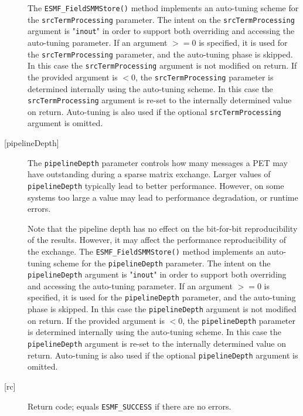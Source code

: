 \begin{description}
       \begin{sloppypar}
       The {\tt ESMF\_FieldSMMStore()} method implements an auto-tuning scheme
       for the {\tt srcTermProcessing} parameter. The intent on the
       {\tt srcTermProcessing} argument is "{\tt inout}" in order to
       support both overriding and accessing the auto-tuning parameter.
       If an argument $>= 0$ is specified, it is used for the
       {\tt srcTermProcessing} parameter, and the auto-tuning phase is skipped.
       In this case the {\tt srcTermProcessing} argument is not modified on
       return. If the provided argument is $< 0$, the {\tt srcTermProcessing}
       parameter is determined internally using the auto-tuning scheme. In this
       case the {\tt srcTermProcessing} argument is re-set to the internally
       determined value on return. Auto-tuning is also used if the optional
       {\tt srcTermProcessing} argument is omitted.
       \end{sloppypar}
  
     \item [{[pipelineDepth]}]
       The {\tt pipelineDepth} parameter controls how many messages a PET
       may have outstanding during a sparse matrix exchange. Larger values
       of {\tt pipelineDepth} typically lead to better performance. However,
       on some systems too large a value may lead to performance degradation,
       or runtime errors.
  
       Note that the pipeline depth has no effect on the bit-for-bit
       reproducibility of the results. However, it may affect the performance
       reproducibility of the exchange.
       The {\tt ESMF\_FieldSMMStore()} method implements an auto-tuning scheme
       for the {\tt pipelineDepth} parameter. The intent on the
       {\tt pipelineDepth} argument is "{\tt inout}" in order to
       support both overriding and accessing the auto-tuning parameter.
       If an argument $>= 0$ is specified, it is used for the
       {\tt pipelineDepth} parameter, and the auto-tuning phase is skipped.
       In this case the {\tt pipelineDepth} argument is not modified on
       return. If the provided argument is $< 0$, the {\tt pipelineDepth}
       parameter is determined internally using the auto-tuning scheme. In this
       case the {\tt pipelineDepth} argument is re-set to the internally
       determined value on return. Auto-tuning is also used if the optional
       {\tt pipelineDepth} argument is omitted.
  
     \item [{[rc]}]
       Return code; equals {\tt ESMF\_SUCCESS} if there are no errors.
  
   \end{description}
   
